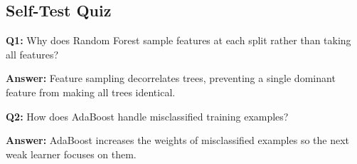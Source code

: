 \documentclass[a4paper,11pt]{article}
\newcommand{\flipanswer}[1]{\par\noindent\textbf{Answer:} #1}
\begin{document}
\subsection{Self-Test Quiz}
\textbf{Q1:} Why does Random Forest sample features at each split rather than taking all features?

\flipanswer{Feature sampling decorrelates trees, preventing a single dominant feature from making all trees identical.}

\textbf{Q2:} How does AdaBoost handle misclassified training examples?

\flipanswer{AdaBoost increases the weights of misclassified examples so the next weak learner focuses on them.}
\end{document}
